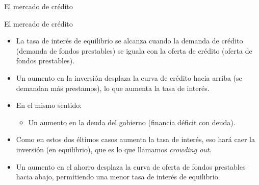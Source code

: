 \documentclass{beamer}
\begin{document}
\begin{frame}{El mercado de crédito}
\begin{center}
\begin{figure}[H]
\renewcommand{\figurename}{Figure}
\begin{center}
\end{center}
\end{figure}
\end{center}  
\end{frame}

\begin{frame}{El mercado de crédito}
    \begin{itemize}
        \item La tasa de interés de equilibrio se alcanza cuando la demanda de crédito (demanda de fondos prestables) se iguala con la oferta de crédito (oferta de fondos prestables).
        \item Un aumento en la inversión desplaza la curva de crédito hacia arriba (se demandan más prestamos), lo que aumenta la tasa de interés.
        \item En el mismo sentido:
        \begin{itemize}
            \item Un aumento en la deuda del gobierno (financia déficit con deuda).
        \end{itemize}
        \item Como en estos dos éltimos casos aumenta la tasa de interés, eso hará caer la inversión (en equilibrio), que es lo que llamamos \textit{crowding out}.
        \item Un aumento en el ahorro desplaza la curva de oferta de fondos prestables hacia abajo, permitiendo una menor tasa de interés de equilibrio.
    \end{itemize}
    
\end{frame}
\end{document}
